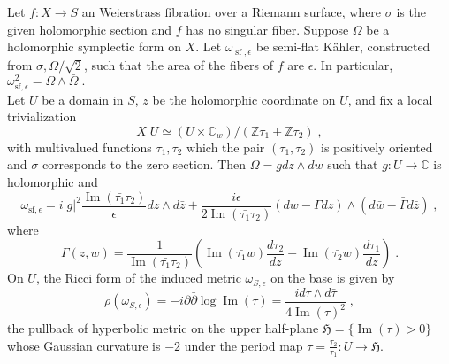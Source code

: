 \begin{proposition}
Let $f\colon X\rightarrow S$ an Weierstrass fibration over a Riemann surface, where $\sigma$ is the given holomorphic section and $f$ has no singular fiber. Suppose $\Omega$ be a holomorphic symplectic form on $X$. Let $\omega_{\operatorname{sf},\epsilon}$ be semi-flat K{\"a}hler, constructed from $\sigma,\Omega/\sqrt{2}$, such that the area of the fibers of $f$ are $\epsilon$. In particular, $\omega_{\mathrm{sf},\epsilon}^2=\Omega\wedge\bar{\Omega}\; .$\\ \indent
Let $U$ be a domain in $S$, $z$ be the holomorphic coordinate on $U$, and fix a local trivialization \[ X|U\simeq (U\times \mathbb{C}_w)/(\mathbb{Z}\tau_1+\mathbb{Z}\tau_2)\; , \] 
with multivalued functions $\tau_1,\tau_2$ which the pair $(\tau_1,\tau_2)$ is positively oriented and $\sigma$ corresponds to the zero section. Then $\Omega=gdz\wedge dw$ such that $g\colon U\rightarrow\mathbb{C}$ is holomorphic and
\[ \omega_{\mathrm{sf},\epsilon}=i|g|^2\frac{\operatorname{Im} (\bar{\tau_1}\tau_2)}{\epsilon}dz\wedge d\bar{z}+\frac{i\epsilon}{2\operatorname{Im} (\bar{\tau_1}\tau_2)}(dw-\Gamma dz)\wedge(d\bar{w}-\bar{\Gamma}d\bar{z})\; , \]
where
\[ \Gamma(z,w)=\frac{1}{\operatorname{Im} (\bar{\tau_1}\tau_2)}\left(\operatorname{Im} (\bar{\tau_1}w)\frac{d\tau_2}{dz}-\operatorname{Im} (\bar{\tau_2}w)\frac{d\tau_1}{dz}\right)\; . \]
\indent On $U$, the Ricci form of the induced metric $\omega_{S,\epsilon}$ on the base is given by
\[ \rho(\omega_{S,\epsilon})=-i\partial\bar{\partial}\log\operatorname{Im} (\tau)=\frac{id\tau\wedge d\bar{\tau}}{4\operatorname{Im} (\tau)^2}\; , \]
the pullback of hyperbolic metric on the upper half-plane $\mathfrak{H}=\{\operatorname{Im} (\tau)>0\}$ whose Gaussian curvature is $-2$  under the period map $\tau=\frac{\tau_2}{\tau_1}\colon U\rightarrow \mathfrak{H}$.
\end{proposition}
